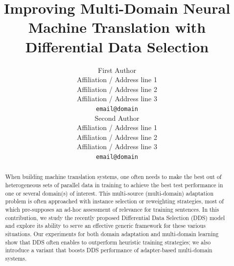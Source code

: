 \documentclass[11pt,a4paper]{article}
\title{Improving Multi-Domain Neural Machine Translation with Differential Data Selection}
\author{First Author \\
  Affiliation / Address line 1 \\
  Affiliation / Address line 2 \\
  Affiliation / Address line 3 \\
  \texttt{email@domain} \\\And
  Second Author \\
  Affiliation / Address line 1 \\
  Affiliation / Address line 2 \\
  Affiliation / Address line 3 \\
  \texttt{email@domain} \\}
\date{}
\begin{document}
\maketitle
\begin{abstract}
  When building machine translation systems, one often needs to make the best out of heterogeneous sets of parallel data in training to achieve the best test performance in one or several domain(s) of interest. This multi-source (multi-domain) adaptation problem is often approached with instance selection or reweighting strategies, most of which pre-supposes an ad-hoc assessment of relevance for training sentences. In this contribution, we study the recently proposed Differential Data Selection (DDS) model  and explore its ability to serve an effective generic framework for these various situations. Our experiments for both domain adaptation and multi-domain learning show that DDS often enables to outperform heuristic training strategies; we also introduce a variant that boosts DDS performance of adapter-based multi-domain systems.

\end{abstract}
\end{document}
